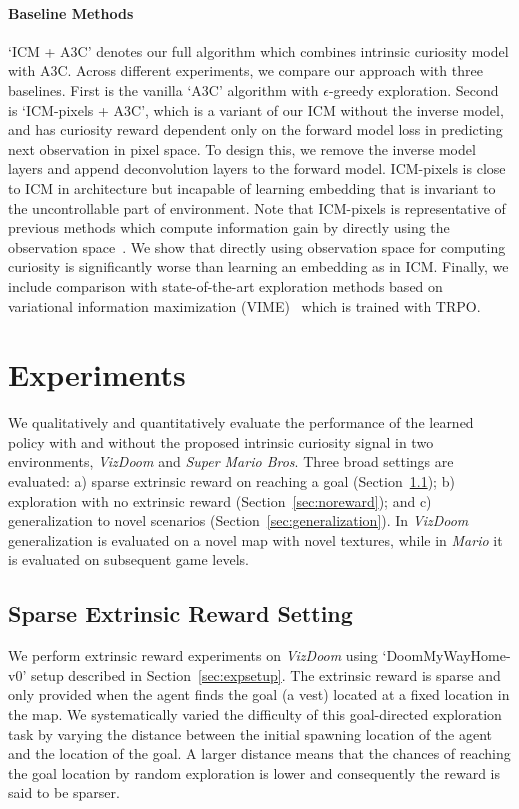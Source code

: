 \documentclass{article}
\begin{document}
\paragraph{Baseline Methods}
`ICM + A3C' denotes our full algorithm which combines intrinsic curiosity model with A3C. Across different experiments, we compare our approach with three baselines. First is the vanilla `A3C' algorithm with $\epsilon$-greedy exploration. Second is `ICM-pixels + A3C', which is a variant of our ICM without the inverse model, and has curiosity reward dependent only on the forward model loss in predicting next observation in pixel space. To design this, we remove the inverse model layers and append deconvolution layers to the forward model. ICM-pixels is close to ICM in architecture but incapable of learning embedding that is invariant to the uncontrollable part of environment. Note that ICM-pixels is representative of previous methods which compute information gain by directly using the observation space~\cite{stadie2015incentivizing,schmidhuber2010formal}. We show that directly using observation space for computing curiosity is significantly worse than learning an embedding as in ICM. Finally, we include comparison with state-of-the-art exploration methods based on variational information maximization (VIME)~\cite{houthooft2016vime} which is trained with TRPO.

\section{Experiments}
\label{sec:results}
We qualitatively and quantitatively evaluate the performance of the learned policy with and without the proposed intrinsic curiosity signal in two environments, {\em VizDoom} and {\em Super Mario Bros}.
Three broad settings are evaluated:
a) sparse extrinsic reward on reaching a goal (Section~\ref{sec:sparse});
b) exploration with no extrinsic reward (Section~\ref{sec:noreward}); and c) generalization
to novel scenarios (Section~\ref{sec:generalization}).
In {\em VizDoom} generalization is evaluated on a novel map with novel textures, while in {\em Mario} it is evaluated on subsequent game levels.

\subsection{Sparse Extrinsic Reward Setting}
\label{sec:sparse}
We perform extrinsic reward experiments on {\em VizDoom} using `DoomMyWayHome-v0' setup described in Section~\ref{sec:expsetup}. The extrinsic reward is sparse and only provided when the agent finds the goal (a vest) located at a fixed location in the map. We systematically varied the difficulty of this goal-directed exploration task
by varying the distance between the initial spawning location of the agent and the location of the goal. A larger distance means that the chances of reaching the goal location by random exploration is lower and consequently the reward is said to be sparser.
\end{document}
